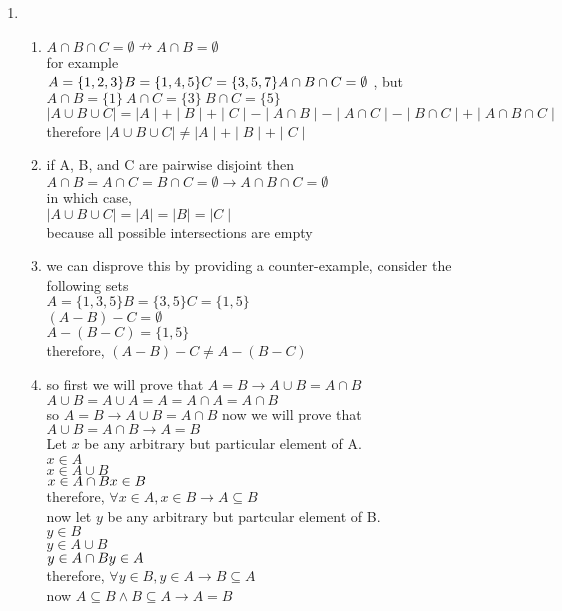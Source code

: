 \documentclass[11pt]{article}
\begin{document}
\begin{enumerate}

\item
\begin{enumerate}
\item $A \cap B \cap C = \emptyset \nrightarrow A \cap B = \emptyset$ \\ for example \\ $A = \{1,2,3\} B = \{1,4,5\} C = \{3,5,7\} \\ A \cap B \cap C = \emptyset$ , but $A \cap B = \{1\} \ A \cap C = \{3\} \ B \cap C = \{5\}$ \\ 
$\mid A \cup B \cup C \mid = \mid A \mid + \mid B \mid + \mid C \mid -   \mid A \cap B \mid - \mid A \cap C \mid - \mid B \cap C \mid + \mid A \cap B \cap C \mid$
\\therefore $\mid A \cup B \cup C \mid \neq \mid A \mid + \mid B \mid + \mid C \mid$

\item if A, B, and C are pairwise disjoint then \\ $A \cap B = A \cap C = B \cap C = \emptyset \to A \cap B \cap C = \emptyset$ \\ in which case, \\ $\mid A \cup B \cup C \mid = \mid A \mid = \mid B \mid = \mid C \mid$ \\ because all possible intersections are empty

\item we can disprove this by providing a counter-example, consider the following sets \\ $A = \{1,3,5\} B = \{3,5\} C = \{1,5\}$ \\ $(A-B)-C = \emptyset$ \\ $A-(B-C) = \{1,5\} $\\ therefore, $(A-B)-C \neq A-(B-C)$

\item so first we will prove that $A=B \to A \cup B = A \cap B$ \\ $A \cup B = A \cup A = A = A \cap A = A \cap B$ \\ so $A = B \to A \cup B = A \cap B$
now we will prove that $A \cup B = A \cap  B \to A = B$ \\ Let $x$ be any arbitrary but particular element of A. \\ $x \in A$ \\ $x \in A \cup B$ \\ $x \in A \cap B \\ x \in B$ \\ therefore, $\forall x \in A, x \in B \to A \subseteq B$ \\ now let $y$ be any arbitrary but partcular element of B.\\ $y \in B$ \\ $y \in A \cup B$ \\ $y \in A \cap B \\ y \in A$ \\ therefore, $\forall y \in B, y \in A \to B \subseteq A$\\ now $A \subseteq B \wedge B \subseteq A \to A = B$


\end{enumerate}
\end{enumerate}
\end{document}
